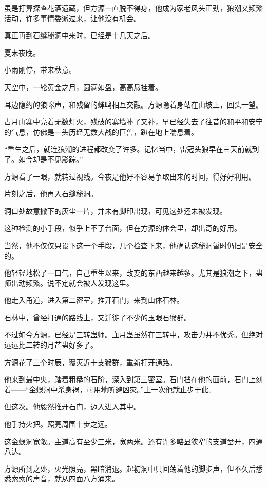 
\begin{this_body}

虽是打算探查花酒遗藏，但方源一直脱不得身，他成为家老风头正劲，狼潮又频繁活动，许多事情委派过来，让他没有机会。

真正再到石缝秘洞中来时，已经是十几天之后。

夏末夜晚。

小雨刚停，带来秋意。

天空中，一轮黄金之月，圆满如盘，高高悬挂着。

耳边隐约的狼嗥声，和残留的蝉鸣相互交融。方源隐着身站在山坡上，回头一望。

古月山寨中亮着无数灯火，残破的寨墙补了又补，早已经失去了往昔的和平和安宁的气息，仿佛是一头历经无数大战的巨兽，趴在地上喘息着。

“重生之后，就连狼潮的进程都改变了许多。记忆当中，雷冠头狼早在三天前就到了。如今却是不见影踪。”

方源看了一眼，就转过视线。今夜是他好不容易争取出来的时间，得好好利用。

片刻之后，他再入石缝秘洞。

洞口处故意撒下的灰尘一片，并未有脚印出现，可见这处还未被发现。

这种检测的小手段，似乎上不了台面，但在方源的体会里，却出奇的好用。

当然，他不仅仅只设下这一个手段，几个检查下来，他确认这秘洞暂时仍旧是安全的。

他轻轻地松了一口气，自己重生以来，改变的东西越来越多。尤其是狼潮之下，蛊师出动频繁。说不定就会被人发现这里。

他走入甬道，进入第二密室，推开石门，来到山体石林。

石林中，曾经打通的路线上，又迁徙了不少的玉眼石猴群。

不过如今方源，已经是三转蛊师。血月蛊虽然在三转中，攻击力并不优秀。但绝对远远比二转的月芒蛊好多了。

方源花了三个时辰，覆灭近十支猴群，重新打开通路。

他来到最中央，踏着粗糙的石阶，深入到第三密室。石门挡在他的面前，石门上刻着——“金蜈洞中杀身祸，可用地听避凶灾。”上一次他就止步于此。

但这次。他毅然推开石门，迈入进入其中。

他手持火把。照亮周围十步之远。

这金蜈洞宽敞。主道高有至少三米，宽两米。还有许多略显狭窄的支道岔开，四通八达。

方源所到之处，火光照亮，黑暗消退。起初洞中只回荡着他的脚步声，但不久后悉悉索索的声音，就从四面八方涌来。


\end{this_body}
